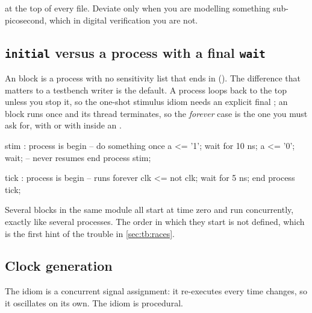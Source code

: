 \begin{ruleofthumb}
 at the top of every file. Deviate only when you are
modelling something sub-picosecond, which in digital verification you are not.
\end{ruleofthumb}

\subsection{\texttt{initial} versus a process with a final \texttt{wait}}

An  block is a \VHDL{} process with no
sensitivity list that ends in  (). The difference
that matters to a testbench writer is the default. A \VHDL{} process loops back
to the top unless you stop it, so the one-shot stimulus idiom needs an explicit
final ; an  block runs once and its thread terminates,
so the \emph{forever} case is the one you must ask for, with  or
with  inside an .

\begin{rosetta}
\begin{rleft}
stim : process is
begin
  -- do something once
  a <= '1';
  wait for 10 ns;
  a <= '0';
  wait;              -- never resumes
end process stim;

tick : process is
begin
  -- runs forever
  clk <= not clk;
  wait for 5 ns;
end process tick;
\end{rleft}
\end{rosetta}

Several  blocks in the same module all start at time zero and run
concurrently, exactly like several \VHDL{} processes. The order in which they
start is not defined, which is the first hint of the trouble in
\cref{sec:tb:races}.

\subsection{Clock generation}

The \VHDL{} idiom  is a concurrent signal
assignment: it re-executes every time  changes, so it oscillates on
its own. The \SV{} idiom is procedural.

